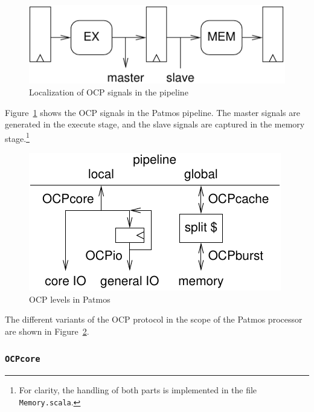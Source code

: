 \documentclass[a4paper,fontsize=10pt,twoside,DIV15,BCOR12mm,headinclude=true,footinclude=false,pagesize,bibtotoc]{scrbook}
\newcommand{\code}[1]{{\texttt{#1}}}
\begin{document}
\begin{figure}
  \centering
  \includegraphics[scale=.8]{fig/ocppipe}
  \caption{Localization of OCP signals in the pipeline}
  \label{fig:ocppipe}
\end{figure}

Figure~\ref{fig:ocppipe} shows the OCP signals in the Patmos
pipeline. The master signals are generated in the execute stage, and
the slave signals are captured in the memory stage.\footnote{For
  clarity, the handling of both parts is implemented in the file
  \code{Memory.scala}.}

\begin{figure}
  \centering
  \includegraphics[scale=.8]{fig/ocplevels}
  \caption{OCP levels in Patmos}
  \label{fig:ocplevels}
\end{figure}

The different variants of the OCP protocol in the scope of the Patmos
processor are shown in Figure~\ref{fig:ocplevels}.

\subsubsection{\code{OCPcore}}
\end{document}
